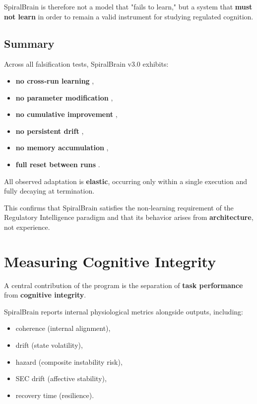 \documentclass[12pt,a4paper]{report}
\begin{document}
SpiralBrain is therefore not a model that "fails to learn," but a system that \textbf{must not learn} in order to remain a valid instrument for studying regulated cognition.

\subsection{Summary}

Across all falsification tests, SpiralBrain v3.0 exhibits:

\begin{itemize}
\item \textbf{no cross‑run learning} \cite{SpiralBrainV3},  
\item \textbf{no parameter modification} \cite{SpiralBrainV3},  
\item \textbf{no cumulative improvement} \cite{SpiralBrainV3},  
\item \textbf{no persistent drift} \cite{SpiralBrainV3},  
\item \textbf{no memory accumulation} \cite{SpiralBrainV3},  
\item \textbf{full reset between runs} \cite{SpiralBrainV3}.
\end{itemize}

All observed adaptation is \textbf{elastic}, occurring only within a single execution and fully decaying at termination.

This confirms that SpiralBrain satisfies the non‑learning requirement of the Regulatory Intelligence paradigm and that its behavior arises from \textbf{architecture}, not experience.

\section{Measuring Cognitive Integrity}

A central contribution of the program is the separation of \textbf{task performance} from \textbf{cognitive integrity}.

SpiralBrain reports internal physiological metrics alongside outputs, including:

\begin{itemize}
\item coherence (internal alignment),
\item drift (state volatility),
\item hazard (composite instability risk),
\item SEC drift (affective stability),
\item recovery time (resilience).
\end{itemize}
\end{document}
